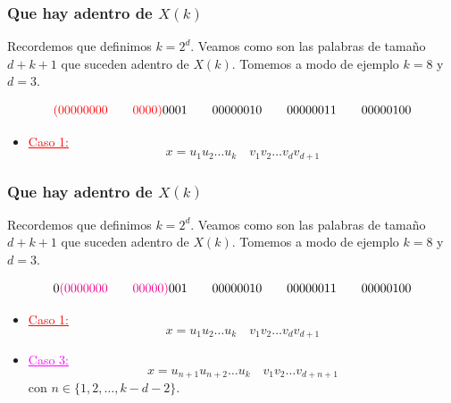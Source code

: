 \documentclass[10pt,mathserif]{beamer}%
\begin{document}
\begin{frame}
  \frametitle{Que hay adentro de $X(k)$}
  Recordemos que definimos $k = 2^d$.
  Veamos como son las palabras de tamaño $d + k + 1$ que suceden adentro de $X(k)$. Tomemos a modo de ejemplo $k = 8$ y $d = 3$.

  $$\textcolor{red}{(00000000 \qquad 0000)} 0001 \qquad 00000010 \qquad 00000011 \qquad 00000100$$

    \begin{itemize}
    \item \textcolor{red}{\underline{Caso 1:}}
    $$x = u_1 u_2 \dots u_k \quad v_1 v_2 \dots v_{d} v_{d + 1}$$
    \par
  \end{itemize}
\end{frame} 

\begin{frame}
  \frametitle{Que hay adentro de $X(k)$}
  Recordemos que definimos $k = 2^d$.
  Veamos como son las palabras de tamaño $d + k + 1$ que suceden adentro de $X(k)$. Tomemos a modo de ejemplo $k = 8$ y $d = 3$.

  $$0\textcolor{magenta}{(0000000 \qquad 00000)} 001 \qquad 00000010 \qquad 00000011 \qquad 00000100$$

    \begin{itemize}
    \item \textcolor{red}{\underline{Caso 1:}}
    $$x = u_1 u_2 \dots u_k \quad v_1 v_2 \dots v_{d} v_{d + 1}$$  
    \par
    \item \textcolor{magenta}{\underline{Caso 3:}}
    $$x = u_{n+1} u_{n+2} \dots u_k \quad  v_1 v_2 \dots v_{d+n+1} $$
    con $n \in \{1,2,\dots ,k - d - 2\}$.
    \par
  \end{itemize}
\end{frame}
\end{document}
